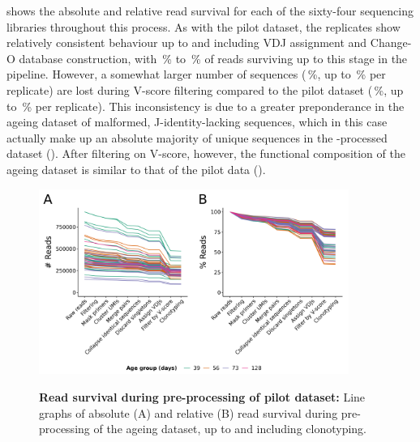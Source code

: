  shows the absolute and relative read survival for each of the sixty-four sequencing libraries throughout this process. As with the pilot dataset, the replicates show relatively consistent behaviour up to and including VDJ assignment and Change-O database construction, with \,\% to \,\% of reads surviving up to this stage in the pipeline. However, a somewhat larger number of sequences (\,\%, up to \,\% per replicate) are lost during V-score filtering compared to the pilot dataset (\,\%, up to \,\% per replicate). This inconsistency is due to a greater preponderance in the ageing dataset of malformed, J-identity-lacking sequences, which in this case actually make up an absolute majority of unique sequences in the -processed dataset (). After filtering on V-score, however, the functional composition of the ageing dataset is similar to that of the pilot data ().

\begin{figure}
\centering
\includegraphics[width = 0.9\textwidth]{_Figures/png/ageing-read-survival-all.png}
\begin{subfigure}{0em}
\label{fig:igseq-ageing-read-survival-all-abs}
\end{subfigure}
\begin{subfigure}{0em}
\label{fig:igseq-ageing-read-survival-all-rel}
\end{subfigure}
\caption[Read survival during pre-processing of \igseq ageing dataset]{\textbf{Read survival during pre-processing of \igseq pilot dataset:} Line graphs of absolute (A) and relative (B) read survival during pre-processing of the \igseq ageing dataset, up to and including clonotyping.}
\label{fig:igseq-ageing-read-survival-all}
\end{figure}


